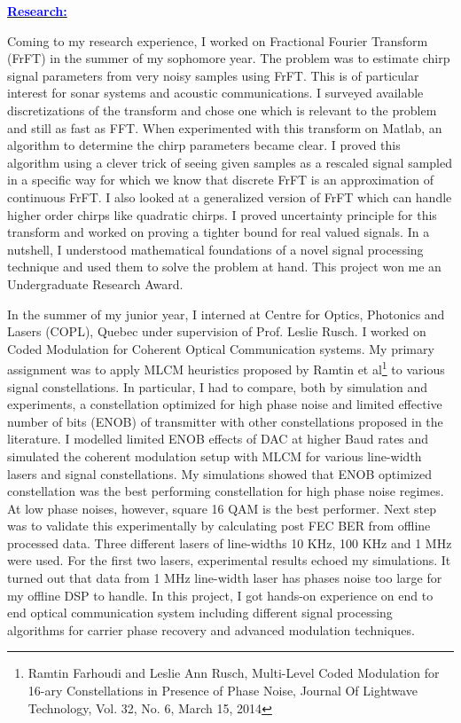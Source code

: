 \documentclass[11pt]{article}
\newcommand{\statement}[1]{\par\medskip
  \underline{\textcolor{blue}{\textbf{#1:}}}\space
}
\begin{document}
\statement{Research}
Coming to my research experience, I worked on Fractional Fourier Transform (FrFT) in the summer of my sophomore year. 
The problem was to estimate chirp signal parameters from very noisy samples using FrFT. This is of particular interest for sonar systems and acoustic communications. 
I surveyed available discretizations of the transform and chose one which is relevant to the problem and still as fast as FFT. 
When experimented with this transform on Matlab, an algorithm to determine the chirp parameters became clear. 
I proved this algorithm using a clever trick of seeing given samples as a rescaled signal sampled in a specific way for which we know that discrete FrFT is an approximation of continuous FrFT. 
I also looked at a generalized version of FrFT which can handle higher order chirps like quadratic chirps. 
I proved uncertainty principle for this transform and worked on proving a tighter bound for real valued signals. 
In a nutshell, I understood mathematical foundations of a novel signal processing technique and used them to solve the problem at hand. This project won me an Undergraduate Research Award.

In the summer of my junior year, I interned at Centre for Optics, Photonics and Lasers (COPL), Quebec under supervision of Prof. Leslie Rusch. I worked on Coded Modulation for Coherent Optical Communication systems. 
My primary assignment was to apply MLCM heuristics proposed by Ramtin et al\footnote{ Ramtin Farhoudi and Leslie Ann Rusch, Multi-Level Coded Modulation for 16-ary Constellations in Presence of Phase Noise, Journal Of Lightwave Technology, Vol. 32, No. 6, March 15, 2014}
to various signal constellations. 
In particular, I had to compare, both by simulation and experiments, a constellation optimized for high phase noise and limited effective number of bits (ENOB) of transmitter with other constellations proposed in the literature. 
I modelled limited ENOB effects of DAC at higher Baud rates and simulated the coherent modulation setup with MLCM for various line-width lasers and signal constellations.
 My simulations showed that ENOB optimized constellation was the best performing constellation for high phase noise regimes. 
At low phase noises, however, square 16 QAM is the best performer. Next step was to validate this experimentally by calculating post FEC BER from offline processed data. 
Three different lasers of line-widths 10 KHz, 100 KHz and 1 MHz were used. For the first two lasers, experimental results echoed my simulations. 
It turned out that data from 1 MHz line-width laser has phases noise too large for my offline DSP to handle. 
In this project, I got hands-on experience on end to end optical communication system including different signal processing algorithms for carrier phase recovery and advanced modulation techniques.
\end{document}
